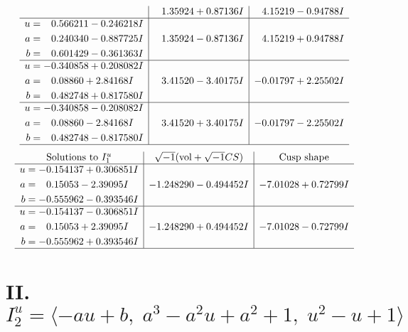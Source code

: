 \documentclass[1p]{elsarticle_modified}
\theoremstyle{definition}
\newcommand{\I}{\sqrt{-1}}
\begin{document}
$$\begin{array}{c|c|c}
 & \phantom{-}1.35924 + 0.87136 I & \phantom{-}4.15219 - 0.94788 I \\ \hline\begin{aligned}
u &= \phantom{-}0.566211 - 0.246218 I \\
a &= \phantom{-}0.240340 - 0.887725 I \\
b &= \phantom{-}0.601429 - 0.361363 I\end{aligned}
 & \phantom{-}1.35924 - 0.87136 I & \phantom{-}4.15219 + 0.94788 I \\ \hline\begin{aligned}
u &= -0.340858 + 0.208082 I \\
a &= \phantom{-}0.08860 + 2.84168 I \\
b &= \phantom{-}0.482748 + 0.817580 I\end{aligned}
 & \phantom{-}3.41520 - 3.40175 I & -0.01797 + 2.25502 I \\ \hline\begin{aligned}
u &= -0.340858 - 0.208082 I \\
a &= \phantom{-}0.08860 - 2.84168 I \\
b &= \phantom{-}0.482748 - 0.817580 I\end{aligned}
 & \phantom{-}3.41520 + 3.40175 I & -0.01797 - 2.25502 I\\
 \hline 
 \end{array}$$\newpage$$\begin{array}{c|c|c}  
\text{Solutions to }I^u_{1}& \I (\text{vol} + \sqrt{-1}CS) & \text{Cusp shape}\\
 \hline 
\begin{aligned}
u &= -0.154137 + 0.306851 I \\
a &= \phantom{-}0.15053 - 2.39095 I \\
b &= -0.555962 - 0.393546 I\end{aligned}
 & -1.248290 - 0.494452 I & -7.01028 + 0.72799 I \\ \hline\begin{aligned}
u &= -0.154137 - 0.306851 I \\
a &= \phantom{-}0.15053 + 2.39095 I \\
b &= -0.555962 + 0.393546 I\end{aligned}
 & -1.248290 + 0.494452 I & -7.01028 - 0.72799 I\\
 \hline 
 \end{array}$$\newpage\newpage\renewcommand{\arraystretch}{1}
\centering \section*{II. $I^u_{2}= \langle - a u+b,\;a^3- a^2 u+a^2+1,\;u^2- u+1 \rangle$}
\end{document}
